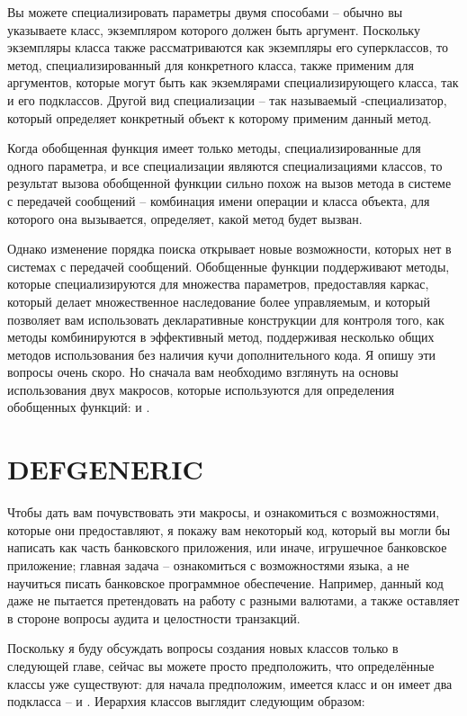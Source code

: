 Вы можете специализировать параметры двумя способами -- обычно вы указываете класс,
экземпляром которого должен быть аргумент.  Поскольку экземпляры класса также
рассматриваются как экземпляры его суперклассов, то метод, специализированный для
конкретного класса, также применим для аргументов, которые могут быть как экземлярами
специализирующего класса, так и его подклассов.  Другой вид специализации -- так
называемый -специализатор, который определяет конкретный объект к которому
применим данный метод.

Когда обобщенная функция имеет только методы, специализированные для одного параметра, и
все специализации являются специализациями классов, то результат вызова обобщенной функции
сильно похож на вызов метода в системе с передачей сообщений -- комбинация имени операции
и класса объекта, для которого она вызывается, определяет, какой метод будет вызван.

Однако изменение порядка поиска открывает новые возможности, которых нет в системах с
передачей сообщений.  Обобщенные функции поддерживают методы, которые специализируются для
множества параметров, предоставляя каркас, который делает множественное наследование более
управляемым, и который позволяет вам использовать декларативные конструкции для контроля
того, как методы комбинируются в эффективный метод, поддерживая несколько общих методов
использования без наличия кучи дополнительного кода. Я опишу эти вопросы очень скоро.  Но
сначала вам необходимо взглянуть на основы использования двух макросов, которые
используются для определения обобщенных функций:  и .

\section{DEFGENERIC}

Чтобы дать вам почувствовать эти макросы, и ознакомиться с возможностями, которые они
предоставляют, я покажу вам некоторый код, который вы могли бы написать как часть
банковского приложения, или иначе, игрушечное банковское приложение; главная задача --
ознакомиться с возможностями языка, а не научиться писать банковское программное
обеспечение.  Например, данный код даже не пытается претендовать на работу с разными
валютами, а также оставляет в стороне вопросы аудита и целостности транзакций.

Поскольку я буду обсуждать вопросы создания новых классов только в следующей главе, сейчас
вы можете просто предположить, что определённые классы уже существуют: для начала
предположим, имеется класс  и он имеет два подкласса --
 и .  Иерархия классов выглядит следующим
образом:

